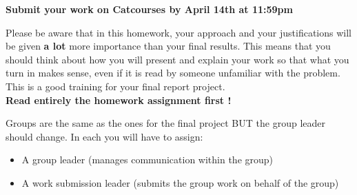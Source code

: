 \documentclass[11pt]{article}
\begin{document}
{\bf Submit your work on Catcourses by April 14th at 11:59pm}

Please be aware that in this homework, your approach and your justifications will be given {\bf a lot} more importance than your final results. This means that you should think about how you will present and explain your work so that what you turn in makes sense, even if it is read by someone unfamiliar with the problem. This is a good training for your final report project.\\
\textbf{Read entirely the homework assignment first !}

Groups are the same as the ones for the final project BUT the group leader should change. In each you will have to assign:
\begin{itemize}
\item A group leader (manages communication within the group)
\item A work submission leader (submits the group work on behalf of the group)
\end{itemize}


\end{document}
